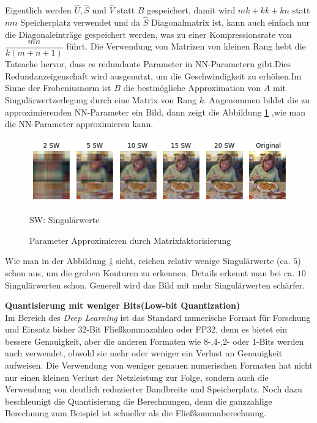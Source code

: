 \documentclass[12pt,a4paper]{scrartcl}
\numberwithin{equation}{section}
\begin{document}
Eigentlich werden $ \widehat{U} , \widehat{S} $ und $ \widehat{V} $ statt $ B $ gespeichert, damit wird $ m k + k k + k n $ statt $ mn $ Speicherplatz verwendet und da $ \widehat{S} $ Diagonalmatrix ist, kann auch einfach nur die Diagonaleinträge gespeichert werden, was zu einer Kompressionsrate von $ \dfrac{mn}{k(m+n+1)} $ führt. Die Verwendung von Matrizen von kleinen Rang hebt die Tatsache hervor, dass es redundante Parameter in \ac{NN}-Parametern gibt.Dies Redundanzeigenschaft wird ausgenutzt, um die Geschwindigkeit zu erhöhen\cite[Denton et al]{matrix quantization}.Im Sinne der Frobeniusnorm ist $ B $ die bestmögliche Approximation von $ A $ mit Singulärwertzerlegung durch eine Matrix von Rang $ k $.
Angenommen bildet die zu approximierenden NN-Parameter ein Bild, dann zeigt die Abbildung \ref{fig:matrix_fatorization} ,wie man die NN-Parameter approximieren kann.

\begin{figure}[h]
	\centering
	\includegraphics[width=\textwidth]{matrix_fatorization}
	\begin{center}
		SW: Singulärwerte
	\end{center}
	\caption{Parameter Approximieren durch Matrixfaktorisierung }
	\label{fig:matrix_fatorization}
\end{figure}
Wie man in der Abbildung \ref{fig:matrix_fatorization} sieht, reichen  relativ wenige Singulärwerte (ca. $ 5 $) schon aus, um die groben Konturen zu erkennen. Details erkennt man bei ca. $ 10 $ Singulärwerten schon. Generell wird das Bild mit mehr Singulärwerten schärfer.

\textbf{Quantisierung mit weniger Bits(Low-bit Quantization)}\\
Im Bereich des \textit{Deep Learning} ist das Standard numerische Format für Forschung und Einsatz bisher 32-Bit Fließkommazahlen oder FP32, denn es bietet ein bessere Genauigkeit, aber die anderen Formaten wie 8-,4-,2- oder 1-Bits werden auch verwendet, obwohl sie mehr oder weniger ein Verlust an Genauigkeit aufweisen.
Die Verwendung von weniger genauen numerischen Formaten hat nicht nur einen kleinen Verlust der Netzleistung zur Folge, sondern auch die Verwendung von deutlich reduzierter Bandbreite und Speicherplatz. Noch dazu beschleunigt die Quantisierung die Berechnungen, denn die ganzzahlige Berechnung zum Beispiel ist schneller als die Fließkommaberechnung.
\end{document}
